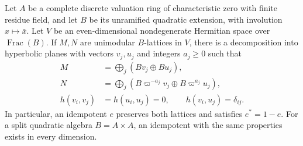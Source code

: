\begin{lemma}\label{te-local-pair}
Let $A$ be a complete discrete valuation ring of
characteristic zero with finite residue field, and let $B$
be its unramified quadratic extension, with involution
$x\mapsto\bar x$.  Let $V$ be an even-dimensional
nondegenerate Hermitian space over $\operatorname{Frac}(B)$.
If $M,N$ are unimodular $B$-lattices in $V$, there is a
decomposition into hyperbolic planes with vectors $v_j,u_j$
and integers $a_j\geq0$ such that
\[
 \begin{split}
 M&=\bigoplus_j(Bv_j\oplus Bu_j),\\
 N&=\bigoplus_j(B\varpi^{-a_j}v_j\oplus B\varpi^{a_j}u_j),\\
 h(v_i,v_j)&=h(u_i,u_j)=0,\qquad h(v_i,u_j)=\delta_{ij}.
 \end{split}
 \tag{TE4}
\]
In particular, an idempotent $e$ preserves both lattices
and satisfies $e^*=1-e$.
For a split quadratic algebra $B=A\times A$, an idempotent
with the same properties exists in every dimension.
\end{lemma}
